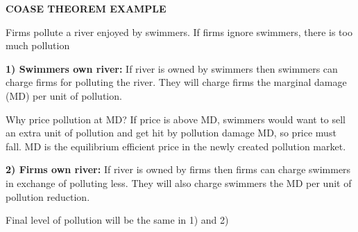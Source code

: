 \documentclass[landscape]{slides}
\begin{document}
\begin{slide}
\begin{center}
{\bf COASE THEOREM EXAMPLE}
\end{center}
Firms pollute a river enjoyed by swimmers. If firms ignore swimmers, there is too much pollution

\textbf{1) Swimmers own river:} If river is owned by swimmers then swimmers can charge firms for polluting the river.
They will charge firms the marginal damage (MD) per unit of pollution.

\small
Why price pollution at MD? If price is above MD, swimmers would want to sell an extra unit of pollution and get hit by pollution damage MD, so price must fall.  MD is the equilibrium efficient price in the newly created pollution market.

\normalsize

\textbf{2) Firms own river:} If river is owned by firms then firms can charge swimmers in exchange of
polluting less. They will also charge swimmers the MD per unit of pollution reduction.

Final level of pollution will be the same in 1) and 2)

\end{slide}

\begin{slide}

\end{slide}
\end{document}
